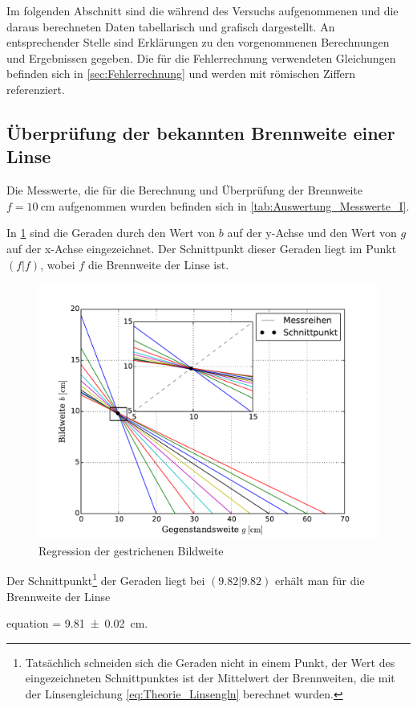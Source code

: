 Im folgenden Abschnitt sind die während des Versuchs aufgenommenen 
und die daraus berechneten Daten tabellarisch und grafisch dargestellt.
An entsprechender Stelle sind Erklärungen zu den vorgenommenen Berechnungen 
und Ergebnissen gegeben. Die für die Fehlerrechnung verwendeten Gleichungen
befinden sich in \cref{sec:Fehlerrechnung} und werden mit römischen Ziffern
referenziert.

\subsection{Überprüfung der bekannten Brennweite einer Linse}

	Die Messwerte, die für die Berechnung und Überprüfung der Brennweite $f=\SI{10}{\centi\meter}$ aufgenommen wurden 
	befinden sich in \cref{tab:Auswertung_Messwerte_I}.
	
	  			
	
	In \cref{fig:Auswertung_BekannteLinse} sind die Geraden durch den Wert von $b$ auf der y-Achse und den Wert von $g$
	auf der x-Achse eingezeichnet. Der Schnittpunkt dieser Geraden liegt im Punkt $(f|f)$, wobei $f$
	die Brennweite der Linse ist.
	  
	\begin{figure}[!h]
		\centering
		\includegraphics[scale=.7]{Grafiken/Messwerte_Bekannt.pdf}
		\caption{Regression der gestrichenen Bildweite\label{fig:Auswertung_BekannteLinse}}
	\end{figure}  
	 
	 Der Schnittpunkt\footnote{Tatsächlich schneiden sich die Geraden nicht in einem Punkt, der Wert
	 des eingezeichneten Schnittpunktes ist der Mittelwert der Brennweiten, die mit der Linsengleichung
	 \cref{eq:Theorie_Linsengln} berechnet
	 wurden.} der Geraden liegt bei $(9.82|9.82)$ erhält man für die Brennweite der Linse
	 \begin{empheq}{equation}
		\label{val:Auswertung_Bekannt}
		 = \SI{9.81(2)}{\centi\meter}.
	 \end{empheq}
	 
